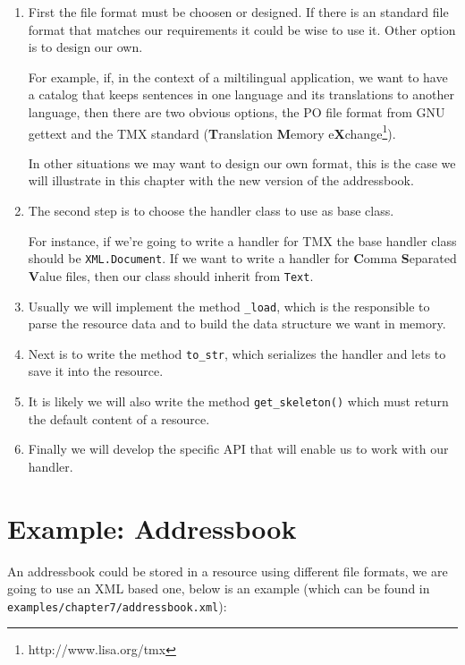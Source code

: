 \begin{enumerate}
  \item First the file format must be choosen or designed. If there is an
    standard file format that matches our requirements it could be wise to
    use it. Other option is to design our own.

    For example, if, in the context of a miltilingual application, we want
    to have a catalog that keeps sentences in one language and its
    translations to another language, then there are two obvious options,
    the PO file format from GNU gettext and the TMX standard ({\bf T}ranslation
    {\bf M}emory e{\bf X}change\footnote{http://www.lisa.org/tmx}).

    In other situations we may want to design our own format, this is the
    case we will illustrate in this chapter with the new version of
    the addressbook.

  \item The second step is to choose the handler class to use as base class.

    For instance, if we're going to write a handler for TMX the base handler
    class should be {\tt XML.Document}. If we want to write a handler for
    {\bf C}omma {\bf S}eparated {\bf V}alue files, then our class should
    inherit from {\tt Text}.

  \item Usually we will implement the method {\tt \_load}, which is the
    responsible to parse the resource data and to build the data structure
    we want in memory.

  \item Next is to write the method {\tt to\_str}, which serializes the
    handler and lets to save it into the resource.

  \item It is likely we will also write the method {\tt get\_skeleton()}
    which must return the default content of a resource.

  \item Finally we will develop the specific API that will enable us to
    work with our handler.
\end{enumerate}

\section{Example: Addressbook}

An addressbook could be stored in a resource using different file formats,
we are going to use an XML based one, below is an example (which can be
found in {\tt examples/chapter7/addressbook.xml}):

